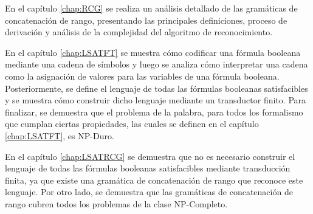 \documentclass[12pt]{article}
\begin{document}
En el capítulo \ref{chap:RCG} se realiza un análisis detallado de las gramáticas de concatenación de rango, presentando las principales
definiciones, proceso de derivación y análisis de la complejidad del algoritmo de reconocimiento.

En el capítulo \ref{chap:LSATFT} se muestra cómo codificar una fórmula booleana mediante una cadena de símbolos y luego
se analiza cómo interpretar una cadena como la asignación de valores para las variables de una fórmula booleana.
Posteriormente, se define el lenguaje de todas las fórmulas booleanas satisfacibles y se muestra cómo construir dicho
lenguaje mediante un transductor finito. Para finalizar, se demuestra que el problema de la palabra, para todos los formalismo que cumplan ciertas propiedades,
las cuales se definen en el capítulo \ref{chap:LSATFT}, es NP-Duro.

En el capítulo \ref{chap:LSATRCG} se demuestra que no es necesario construir el lenguaje de todas las fórmulas
booleanas satisfacibles mediante transducción finita, ya que existe una gramática de concatenación de rango que reconoce
este lenguaje. Por otro lado, se demuestra que las gramáticas de concatenación de rango cubren todos los problemas de la clase NP-Completo.
\end{document}
